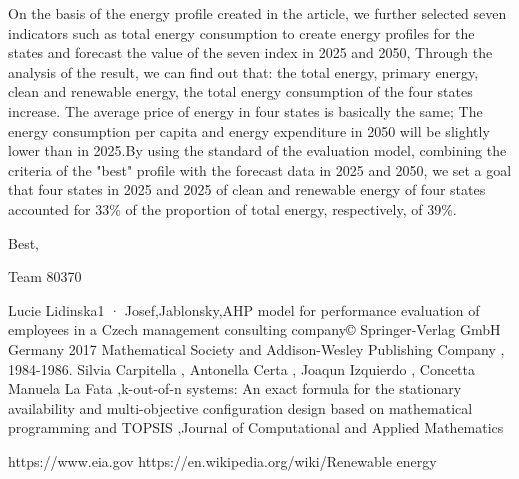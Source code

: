 On the basis of the energy profile created in the article, we further selected seven indicators such as total energy consumption to create energy profiles for the states and forecast the value of the seven index in 2025 and 2050, Through the analysis of the result, we can find out that: the total energy, primary energy, clean and renewable energy, the total energy consumption of the four states increase. The average price of energy in four states is basically the same; The energy consumption per capita and energy expenditure in 2050 will be slightly lower than in 2025.By using the standard of the evaluation model, combining the criteria of the "best" profile with the forecast data in 2025 and 2050, we set a goal that four states in 2025 and 2025 of clean and renewable energy of four states accounted for 33\% of the proportion of total energy, respectively, of 39\%.



Best,


Team 80370

















\begin{thebibliography}{99}
 Lucie Lidinska1 · Josef,Jablonsky,AHP model for performance evaluation of employees in a Czech management consulting company© Springer-Verlag GmbH Germany 2017
Mathematical Society and Addison-Wesley
Publishing Company , 1984-1986.
Silvia Carpitella , Antonella Certa , Joaqun Izquierdo , Concetta Manuela La Fata ,k-out-of-n systems: An exact formula for the stationary availability and multi-objective configuration design based on mathematical programming and TOPSIS ,Journal of Computational and Applied Mathematics


https://www.eia.gov
https://en.wikipedia.org/wiki/Renewable energy
\end{thebibliography}

